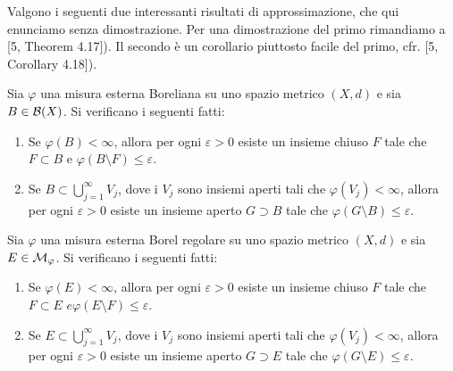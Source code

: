 Valgono i seguenti due interessanti risultati di approssimazione, che qui enunciamo senza dimostrazione. Per una dimostrazione del primo rimandiamo a [5, Theorem 4.17]). Il secondo è un corollario piuttosto facile del primo, cfr. [5, Corollary 4.18]).

\begin{shadedTheorem} Sia $\varphi$ una misura esterna Boreliana su uno spazio metrico $(X, d)$ e sia $B \in \mathcal{B}(X)$. Si verificano i seguenti fatti:
  \begin{enumerate}
    \item Se $\varphi(B)<\infty$, allora per ogni $\varepsilon>0$ esiste un insieme chiuso $F$ tale che $F \subset B$ e $\varphi(B\setminus F) \leq \varepsilon$.
    \item Se $B \subset \bigcup_{j=1}^{\infty} V_{j}$, dove i $V_{j}$ sono insiemi aperti tali che $\varphi\left(V_{j}\right)<\infty$, allora per ogni $\varepsilon>0$ esiste un insieme aperto $G \supset B$ tale che $\varphi(G\setminus B) \leq \varepsilon$.
  \end{enumerate}
\end{shadedTheorem}
\begin{shadedTheorem}
  Sia $\varphi$ una misura esterna Borel regolare su uno spazio metrico $(X, d)$ e sia $E \in \mathcal{M}_{\varphi}$. Si verificano i seguenti fatti:
\begin{enumerate}
  \item Se $\varphi(E)<\infty$, allora per ogni $\varepsilon>0$ esiste un insieme chiuso $F$ tale che $F \subset E$ $e \varphi(E\setminus F) \leq \varepsilon$.
  \item Se $E \subset \bigcup_{j=1}^{\infty} V_{j}$, dove i $V_{j}$ sono insiemi aperti tali che $\varphi\left(V_{j}\right)<\infty$, allora per ogni $\varepsilon>0$ esiste un insieme aperto $G \supset E$ tale che $\varphi(G\setminus E) \leq \varepsilon$. 
\end{enumerate}
\end{shadedTheorem}

